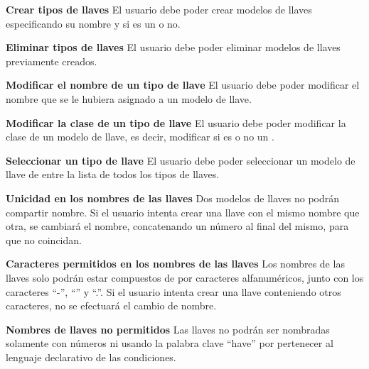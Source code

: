 	\item \textbf{Crear tipos de llaves}\newline
		El usuario debe poder crear modelos de llaves especificando su nombre y si es un  o no.
	\item \textbf{Eliminar tipos de llaves}\newline
		El usuario debe poder eliminar modelos de llaves previamente creados.
	\item \textbf{Modificar el nombre de un tipo de llave}\newline
		El usuario debe poder modificar el nombre que se le hubiera asignado a un modelo de llave.
	\item \textbf{Modificar la clase de un tipo de llave}\newline
		El usuario debe poder modificar la clase de un modelo de llave, es decir, modificar si es o no un .
	\item \textbf{Seleccionar un tipo de llave}\newline
		El usuario debe poder seleccionar un modelo de llave de entre la lista de todos los tipos de llaves.
	\item \textbf{Unicidad en los nombres de las llaves}\newline
		Dos modelos de llaves no podrán compartir nombre. Si el usuario intenta crear una llave con el mismo nombre que otra, se cambiará el nombre, concatenando un número al final del mismo, para que no coincidan.
	\item \textbf{Caracteres permitidos en los nombres de las llaves}\newline
		Los nombres de las llaves solo podrán estar compuestos de por caracteres alfanuméricos, junto con los caracteres ``-'', ``\textunderscore'' y ``.''. Si el usuario intenta crear una llave conteniendo otros caracteres, no se efectuará el cambio de nombre. 
	\item \textbf{Nombres de llaves no permitidos}\newline
		Las llaves no podrán ser nombradas solamente con números ni usando la palabra clave ``have'' por pertenecer al lenguaje declarativo de las condiciones.
